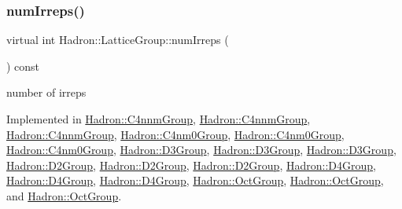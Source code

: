 \mbox{\label{structHadron_1_1LatticeGroup_a3edaca488144b5d2a9cf73fe653add34}} 
\subsubsection{\texorpdfstring{numIrreps()}{numIrreps()}\hspace{0.1cm}{\footnotesize\ttfamily [2/3]}}
{\footnotesize\ttfamily virtual int Hadron\+::\+Lattice\+Group\+::num\+Irreps (\begin{DoxyParamCaption}{ }\end{DoxyParamCaption}) const\hspace{0.3cm}{\ttfamily [pure virtual]}}

number of irreps 

Implemented in \mbox{\hyperlink{structHadron_1_1C4nnmGroup_a70b7d429c62a7f1b2ed77cbc3566ea42}{Hadron\+::\+C4nnm\+Group}}, \mbox{\hyperlink{structHadron_1_1C4nnmGroup_a70b7d429c62a7f1b2ed77cbc3566ea42}{Hadron\+::\+C4nnm\+Group}}, \mbox{\hyperlink{structHadron_1_1C4nnmGroup_a70b7d429c62a7f1b2ed77cbc3566ea42}{Hadron\+::\+C4nnm\+Group}}, \mbox{\hyperlink{structHadron_1_1C4nm0Group_ac77e1943ad8fa5f9211d31dc34ee3f6c}{Hadron\+::\+C4nm0\+Group}}, \mbox{\hyperlink{structHadron_1_1C4nm0Group_ac77e1943ad8fa5f9211d31dc34ee3f6c}{Hadron\+::\+C4nm0\+Group}}, \mbox{\hyperlink{structHadron_1_1C4nm0Group_ac77e1943ad8fa5f9211d31dc34ee3f6c}{Hadron\+::\+C4nm0\+Group}}, \mbox{\hyperlink{structHadron_1_1D3Group_a33e3822d1ec56e4928e5bc47b655f69f}{Hadron\+::\+D3\+Group}}, \mbox{\hyperlink{structHadron_1_1D3Group_a33e3822d1ec56e4928e5bc47b655f69f}{Hadron\+::\+D3\+Group}}, \mbox{\hyperlink{structHadron_1_1D3Group_a33e3822d1ec56e4928e5bc47b655f69f}{Hadron\+::\+D3\+Group}}, \mbox{\hyperlink{structHadron_1_1D2Group_a24644ff5f0fc06adeb26457c9ce772a5}{Hadron\+::\+D2\+Group}}, \mbox{\hyperlink{structHadron_1_1D2Group_a24644ff5f0fc06adeb26457c9ce772a5}{Hadron\+::\+D2\+Group}}, \mbox{\hyperlink{structHadron_1_1D2Group_a24644ff5f0fc06adeb26457c9ce772a5}{Hadron\+::\+D2\+Group}}, \mbox{\hyperlink{structHadron_1_1D4Group_ae8b007038fb1aa79a7267feebf356d4c}{Hadron\+::\+D4\+Group}}, \mbox{\hyperlink{structHadron_1_1D4Group_ae8b007038fb1aa79a7267feebf356d4c}{Hadron\+::\+D4\+Group}}, \mbox{\hyperlink{structHadron_1_1D4Group_ae8b007038fb1aa79a7267feebf356d4c}{Hadron\+::\+D4\+Group}}, \mbox{\hyperlink{structHadron_1_1OctGroup_aed56aa6c4ed7e2a82048b478c916b9d2}{Hadron\+::\+Oct\+Group}}, \mbox{\hyperlink{structHadron_1_1OctGroup_aed56aa6c4ed7e2a82048b478c916b9d2}{Hadron\+::\+Oct\+Group}}, and \mbox{\hyperlink{structHadron_1_1OctGroup_aed56aa6c4ed7e2a82048b478c916b9d2}{Hadron\+::\+Oct\+Group}}.

